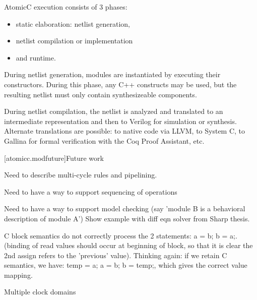 AtomicC execution consists of 3 phases:
\begin{itemize}
\item static elaboration: netlist generation, 
\item netlist compilation or implementation
\item and runtime.
\end{itemize}

During netlist
generation, modules are instantiated by executing their
constructors. During this phase, any C++ constructs may be used, but
the resulting netlist must only contain synthesizeable components.

During netlist compilation, the netlist is analyzed and translated to
an intermediate representation and then to Verilog for simulation or
synthesis. Alternate translations are possible: to native code via
LLVM, to System C, to Gallina for formal verification with the Coq
Proof Assistant, etc.

[atomicc.modfuture]{Future work}

Need to describe multi-cycle rules and pipelining.

Need to have a way to support sequencing of operations

Need to have a way to support model checking (say 'module B is a behavioral description of module A')
Show example with diff eqn solver from Sharp thesis.

C block semantics do not correctly process the 2 statements: a = b; b = a;.
(binding of read values should occur at beginning of block, so that it is clear the
2nd assign refers to the 'previous' value).
Thinking again: if we retain C semantics, we have: temp = a; a = b; b = temp;, which
gives the correct value mapping.

Multiple clock domains

